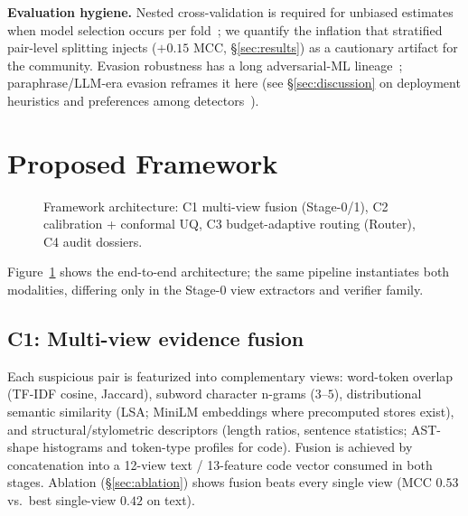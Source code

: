 \documentclass[conference]{IEEEtran}
\newcommand{\mcc}{\mathrm{MCC}}
\begin{document}
\textbf{Evaluation hygiene.} Nested cross-validation is required for unbiased estimates when model
selection occurs per fold~\cite{varma2006}; we quantify the inflation that stratified pair-level
splitting injects ($+0.15$ MCC, \S\ref{sec:results}) as a cautionary artifact for the community.
Evasion robustness has a long adversarial-ML lineage~\cite{biggio2013,brennan2009}; paraphrase/LLM-era
evasion reframes it here (see \S\ref{sec:discussion} on deployment heuristics and preferences
among detectors~\cite{sajid2025,setu2025}).

\section{Proposed Framework}
\label{sec:method}

\begin{figure}[t]
\centering
\setlength{\fboxsep}{6pt}
\caption{Framework architecture: C1 multi-view fusion (Stage-0/1), C2 calibration + conformal UQ,
C3 budget-adaptive routing (Router), C4 audit dossiers.}
\label{fig:arch}
\end{figure}

Figure~\ref{fig:arch} shows the end-to-end architecture; the same pipeline instantiates both
modalities, differing only in the Stage-0 view extractors and verifier family.

\subsection{C1: Multi-view evidence fusion}
Each suspicious pair is featurized into complementary views: word-token overlap (TF-IDF cosine,
Jaccard), subword character n-grams ($3$--$5$), distributional semantic similarity (LSA;
MiniLM embeddings where precomputed stores exist), and structural/stylometric descriptors (length
ratios, sentence statistics; AST-shape histograms and token-type profiles for code). Fusion is
achieved by concatenation into a 12-view text / 13-feature code vector consumed in both stages.
Ablation (\S\ref{sec:ablation}) shows fusion beats every single view ($\mcc$ $0.53$ vs.\ best
single-view $0.42$ on text).
\end{document}
